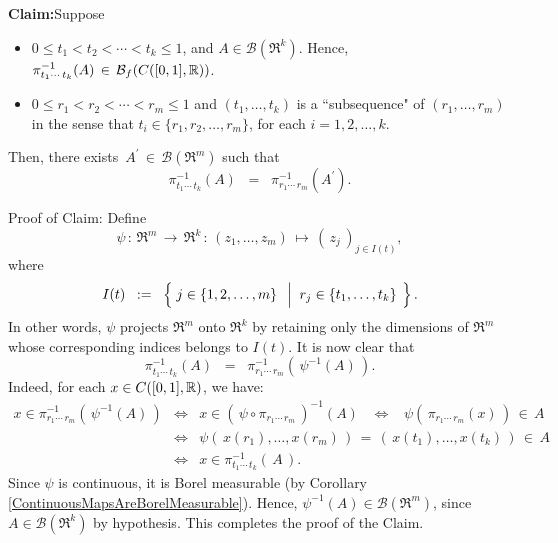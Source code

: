 \begin{enumerate}
\begin{center}
\begin{minipage}{6.0in}
		\noindent
		\textbf{Claim:}\quad Suppose
		\begin{itemize}
		\item	$0 \leq t_{1} < t_{2} < \cdots < t_{k} \leq 1$, and $A \in \mathcal{B}(\Re^{k})$.
				Hence, \,$\pi_{t_{1}\cdots\,t_{k}}^{-1}(A) \,\in\, \mathcal{B}_{f}\!\left(C([0,1],\mathbb{R})\right)$.
		\item	$0 \leq r_{1} < r_{2} < \cdots < r_{m} \leq 1$ and
				$(t_{1},\ldots,t_{k})$ is a ``subsequence" of $(r_{1},\ldots,r_{m})$
				in the sense that $t_{i} \in \{r_{1},r_{2},\ldots,r_{m}\}$, for each $i = 1,2,\ldots,k$.
		\end{itemize}
		Then, there exists \,$A^{\prime} \,\in\, \mathcal{B}(\Re^{m})$ such that
		\begin{equation*}
		\pi_{t_{1}\cdots\,t_{k}}^{-1}(A) \;\; = \;\; \pi_{r_{1}\cdots\,r_{m}}^{-1}(A^{\prime}).
		\end{equation*}
		\end{minipage}
		\end{center}
		\begin{center}
		\begin{minipage}{6.0in}
		\noindent
		Proof of Claim: \quad Define
		\begin{equation*}
		\psi \,:\, \Re^{m} \,\longrightarrow\, \Re^{k} \,:\, (z_{1},\ldots,z_{m}) \,\longmapsto\, \left(\,z_{j}\,\right)_{j \in I(t)},
		\end{equation*}
		where
		\begin{equation*}
			I(t) \;\; := \;\;
			\left\{\;
			j \in \{1,2,\ldots,m\}
			\;\;\left\vert\;\;
			r_{j} \overset{{\color{white}\cdot}}{\in} \{t_{1},\ldots,t_{k}\}
			\right.
			\;\right\}.
		\end{equation*}
		In other words, $\psi$ projects $\Re^{m}$ onto $\Re^{k}$ by retaining only the dimensions
		of $\Re^{m}$ whose corresponding indices belongs to $I(t)$.
		It is now clear that
		\begin{equation*}
		\pi_{t_{1}\cdots\,t_{k}}^{-1}(A)
		\;\; = \;\; \pi_{r_{1}\cdots\,r_{m}}^{-1}\!\left(\,\psi^{-1}(A)\,\right).
		\end{equation*}
		Indeed, for each $x \in C([0,1],\mathbb{R})$, we have:
		\begin{eqnarray*}
		x \in \pi_{r_{1}\cdots\,r_{m}}^{-1}\!\left(\,\psi^{-1}(A)\,\right)
		&\Longleftrightarrow& x \in \left(\,\psi \circ \pi_{r_{1}\cdots\,r_{m}}\,\right)^{-1}\!(A)
		\;\;\;\Longleftrightarrow\;\;\; \psi\!\left(\,\pi_{r_{1}\cdots\,r_{m}}(x)\,\right) \,\in\, A
		\\
		&\Longleftrightarrow& \psi\!\left(\,x(r_{1}),\ldots,x(r_{m})\,\right) \,=\, \left(\,x(t_{1}),\ldots,x(t_{k})\,\right) \,\in\, A
		\\
		&\Longleftrightarrow& x \in \pi_{t_{1}\cdots\,t_{k}}^{-1}\!\left(\,A\,\right).
		\end{eqnarray*}
		Since $\psi$ is continuous, it is Borel measurable (by Corollary \ref{ContinuousMapsAreBorelMeasurable}).
		Hence, $\psi^{-1}\!\left(A\right) \in \mathcal{B}(\Re^{m})$, since $A \in \mathcal{B}(\Re^{k})$ by hypothesis.
		This completes the proof of the Claim.
		\end{minipage}
		\end{center}


\end{enumerate}
